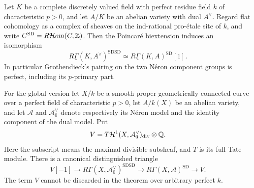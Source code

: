 \begin{theorem}\label{thm:B3-abelian-duality}
Let $K$ be a complete discretely valued field with perfect residue field
$k$ of characteristic $p>0$, and let $A/K$ be an abelian variety with
dual $A^\vee$. Regard flat cohomology as a complex of sheaves on the
ind-rational pro-\'etale site of $k$, and write
$C^{\mathrm{SD}}=R\mathcal Hom(C,{\mathbb{Z}})$. Then the Poincar\'e
biextension induces an isomorphism
\[
 R\underline{\Gamma}(K,A^\vee)^{\mathrm{SDSD}}
 \simeq R\underline{\Gamma}(K,A)^{\mathrm{SD}}[1].
\]
In particular Grothendieck's pairing on the two N\'eron component
groups is perfect, including its $p$-primary part.

For the global version let $X/k$ be a smooth proper geometrically
connected curve over a perfect field of characteristic $p>0$, let
$A/k(X)$ be an abelian variety, and let $\mathcal A$ and
$\mathcal A^\vee_0$ denote respectively its N\'eron model and the
identity component of the dual model. Put
\[
 V=T\mathcal H^1(X,\mathcal A^\vee_0)_{\rm div}\otimes{\ensuremath{\mathbb{Q}}}.
\]
Here the subscript means the maximal divisible subsheaf, and $T$ is
its full Tate module. There is a canonical distinguished triangle
\[
 V[-1]\longrightarrow
 R\underline{\Gamma}(X,\mathcal A^\vee_0)^{\mathrm{SDSD}}
 \longrightarrow R\underline{\Gamma}(X,\mathcal A)^{\mathrm{SD}}
 \longrightarrow V.
\]
The term $V$ cannot be discarded in the theorem over arbitrary perfect
$k$.
\end{theorem}
